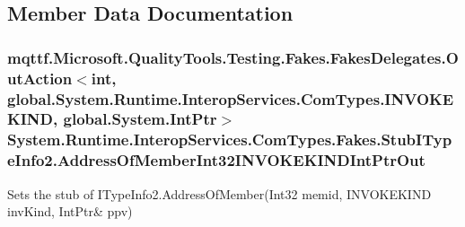 \subsection{Member Data Documentation}
\hypertarget{class_system_1_1_runtime_1_1_interop_services_1_1_com_types_1_1_fakes_1_1_stub_i_type_info2_a27aede40fe4360486883aad4249a712c}{
\subsubsection[{Address\-Of\-Member\-Int32\-I\-N\-V\-O\-K\-E\-K\-I\-N\-D\-Int\-Ptr\-Out}]{\setlength{\rightskip}{0pt plus 5cm}mqttf.\-Microsoft.\-Quality\-Tools.\-Testing.\-Fakes.\-Fakes\-Delegates.\-Out\-Action$<$int, global.\-System.\-Runtime.\-Interop\-Services.\-Com\-Types.\-I\-N\-V\-O\-K\-E\-K\-I\-N\-D, global.\-System.\-Int\-Ptr$>$ System.\-Runtime.\-Interop\-Services.\-Com\-Types.\-Fakes.\-Stub\-I\-Type\-Info2.\-Address\-Of\-Member\-Int32\-I\-N\-V\-O\-K\-E\-K\-I\-N\-D\-Int\-Ptr\-Out}}\label{class_system_1_1_runtime_1_1_interop_services_1_1_com_types_1_1_fakes_1_1_stub_i_type_info2_a27aede40fe4360486883aad4249a712c}


Sets the stub of I\-Type\-Info2.\-Address\-Of\-Member(Int32 memid, I\-N\-V\-O\-K\-E\-K\-I\-N\-D inv\-Kind, Int\-Ptr\& ppv)

